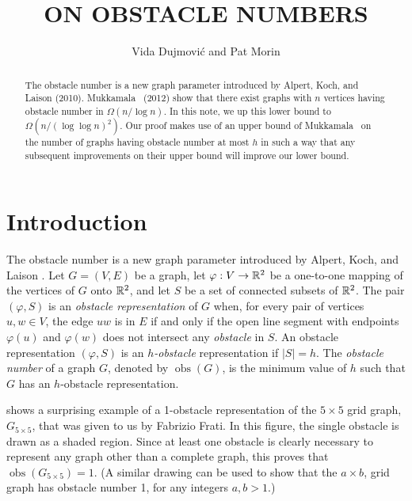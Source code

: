 \documentclass{patmorin}
\title{\MakeUppercase{On Obstacle Numbers}}
\author{Vida Dujmovi\'c and Pat Morin}
\DeclareMathOperator{\obs}{obs}
\begin{document}
\begin{titlepage}
\maketitle

\begin{abstract}
\setlength{\baselineskip}{16.8pt}
The obstacle number is a new graph parameter introduced by Alpert, Koch,
and Laison (2010).  Mukkamala \etal\ (2012) show that there exist graphs
with $n$ vertices having obstacle number in $\Omega(n/\log n)$. In this
note, we up this lower bound to $\Omega(n/(\log\log n)^2)$.  Our proof
makes use of an upper bound of Mukkamala \etal\ on the number of graphs
having obstacle number at most $h$ in such a way that any subsequent
improvements on their upper bound will improve our lower bound.
\end{abstract}
\end{titlepage}


\section{Introduction}

\setlength{\baselineskip}{16.8pt}
The obstacle number is a new graph parameter introduced by Alpert, Koch,
and Laison \cite{alpert.koch.ea:obstacle}.  Let $G=(V,E)$ be a graph,
let $\varphi:V\to \mathbb{R}^2$ be a one-to-one mapping of the vertices of
$G$ onto $\mathbb{R}^2$, and let $S$ be a set of connected subsets of $\mathbb{R}^2$.
The pair $(\varphi,S)$ is an \emph{obstacle representation} of $G$ when,
for every pair of vertices $u,w\in V$, the edge $uw$ is in $E$ if and only
if the open line segment with endpoints $\varphi(u)$ and $\varphi(w)$ does
not intersect any \emph{obstacle} in $S$.  An obstacle representation
$(\varphi,S)$ is an \emph{$h$-obstacle} representation if $|S|=h$.
The \emph{obstacle number} of a graph $G$, denoted by $\obs(G)$, is the
minimum value of $h$ such that $G$ has an $h$-obstacle representation.

 shows a surprising example of a 1-obstacle
representation of the $5\times 5$ grid graph, $G_{5\times 5}$, that
was given to us by Fabrizio Frati. In this figure, the single obstacle
is drawn as a shaded region. Since at least one obstacle is clearly
necessary to represent any graph other than a complete graph, this
proves that $\obs(G_{5\times 5}) = 1$.  (A similar drawing can be used
to show that the $a\times b$, grid graph has obstacle number 1, for any
integers $a,b>1$.)
\end{document}
